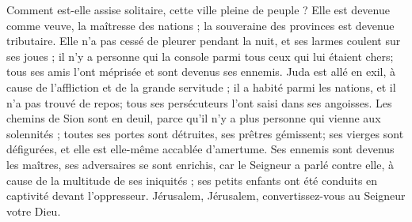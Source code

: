 Comment est-elle assise solitaire, cette ville pleine de peuple ? Elle est devenue comme veuve, la maîtresse des nations ; la souveraine des provinces est devenue tributaire.
Elle n'a pas cessé de pleurer pendant la nuit, et ses larmes coulent sur ses joues ; il n'y a personne qui la console parmi tous ceux qui lui étaient chers; tous ses amis l'ont méprisée et sont devenus ses ennemis.
Juda est allé en exil, à cause de l'affliction et de la grande servitude ; il a habité parmi les nations, et il n'a pas trouvé de repos; tous ses persécuteurs l'ont saisi dans ses angoisses.
Les chemins de Sion sont en deuil, parce qu'il n'y a plus personne qui vienne aux solennités ; toutes ses portes sont détruites, ses prêtres gémissent; ses vierges sont défigurées, et elle est elle-même accablée d'amertume.
Ses ennemis sont devenus les maîtres, ses adversaires se sont enrichis, car le Seigneur a parlé contre elle, à cause de la multitude de ses iniquités ; ses petits enfants ont été conduits en captivité devant l'oppresseur.
Jérusalem, Jérusalem, convertissez-vous au Seigneur votre Dieu.